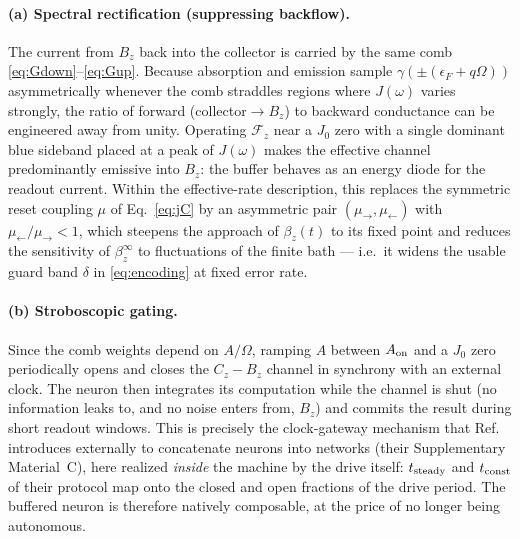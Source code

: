 \documentclass[11pt,a4paper]{article}
\theoremstyle{definition}
\theoremstyle{remark}
\begin{document}
\paragraph{(a) Spectral rectification (suppressing backflow).}
The current from $B_z$ back into the collector is carried by the same
comb \eqref{eq:Gdown}--\eqref{eq:Gup}. Because absorption and emission
sample $\gamma(\pm(\epsilon_F+q\Omega))$ asymmetrically whenever the
comb straddles regions where $J(\omega)$ varies strongly, the ratio of
forward (collector$\to B_z$) to backward conductance can be engineered
away from unity. Operating $\mathcal{F}_z$ near a $J_0$ zero with a
single dominant blue sideband placed at a peak of $J(\omega)$ makes the
effective channel predominantly emissive into $B_z$: the buffer behaves
as an energy diode for the readout current. Within the effective-rate
description, this replaces the symmetric reset coupling $\mu$ of
Eq.~\eqref{eq:jC} by an asymmetric pair
$(\mu_\rightarrow, \mu_\leftarrow)$ with
$\mu_\leftarrow/\mu_\rightarrow < 1$, which steepens the approach of
$\beta_z(t)$ to its fixed point and reduces the sensitivity of
$\beta_z^\infty$ to fluctuations of the finite bath --- i.e.\ it widens
the usable guard band $\delta$ in \eqref{eq:encoding} at fixed error
rate.
 
\paragraph{(b) Stroboscopic gating.}
Since the comb weights depend on $A/\Omega$, ramping $A$ between
$A_{\rm on}$ and a $J_0$ zero periodically opens and closes the
$C_z\!-\!B_z$ channel in synchrony with an external clock. The neuron
then integrates its computation while the channel is shut (no
information leaks to, and no noise enters from, $B_z$) and commits the
result during short readout windows. This is precisely the
clock-gateway mechanism that Ref.~\cite{LipkaBartosik2024} introduces
externally to concatenate neurons into networks (their
Supplementary Material~C), here realized \emph{inside} the machine by
the drive itself: $t_{\rm steady}$ and $t_{\rm const}$ of their
protocol map onto the closed and open fractions of the drive period.
The buffered neuron is therefore natively composable, at the price of
no longer being autonomous.
 
\end{document}

